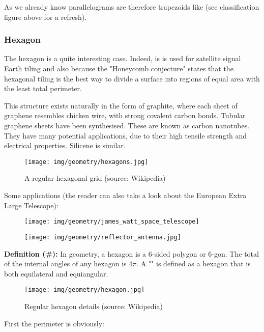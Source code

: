 {	\begin{tcolorbox}[title=Remark,colframe=black,arc=10pt]
	As we already know parallelograms are therefore trapezoids like (see classification figure above for a refresh).
	\end{tcolorbox}	
	
	\subsubsection{Hexagon}	
	The hexagon is a quite interesting case. Indeed, is is used for satellite signal Earth tiling and also because  the "Honeycomb conjecture" states that the hexagonal tiling is the best way to divide a surface into regions of equal area with the least total perimeter. 	
	
	This structure exists naturally in the form of graphite, where each sheet of graphene resembles chicken wire, with strong covalent carbon bonds. Tubular graphene sheets have been synthesised. These are known as carbon nanotubes. They have many potential applications, due to their high tensile strength and electrical properties. Silicene is similar.
	\begin{figure}[H]
		\centering
		\texttt{[image: img/geometry/hexagons.jpg]}
		\caption{A regular hexagonal grid (source: Wikipedia)}
	\end{figure}
	Some applications (the reader can also take a look about the European Extra Large Telescope):
	\begin{figure}[H]
		\centering
		\begin{minipage}{.5\textwidth}
		  \centering
		  \texttt{[image: img/geometry/james\_watt\_space\_telescope]}
		\end{minipage}%
		\begin{minipage}{.5\textwidth}
		  \centering
		  \texttt{[image: img/geometry/reflector\_antenna.jpg]}
		\end{minipage}
	\end{figure}
	
	\textbf{Definition (\#\mydef):} In geometry, a hexagon is a $6$-sided polygon or $6$-gon. The total of the internal angles of any hexagon is $4\pi$. A "" is defined as a hexagon that is both equilateral and equiangular.
	\begin{figure}[H]
		\centering
		\texttt{[image: img/geometry/hexagon.jpg]}
		\caption{Regular hexagon details (source: Wikipedia)}
	\end{figure}
	First the perimeter is obviously:
	
}
